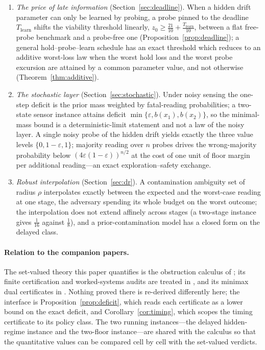\documentclass[11pt,a4paper]{article}
\theoremstyle{plain}
\theoremstyle{definition}
\theoremstyle{remark}
\newcommand{\Tl}{T_{\mathrm{learn}}}
\begin{document}
\begin{enumerate}[leftmargin=1.6em,itemsep=1pt]
\item \emph{The price of late information} (Section~\ref{sec:deadline}). When a hidden drift parameter can only be learned by probing, a probe pinned to the deadline $\Tl$ shifts the viability threshold linearly, $z_0\ge\tfrac{21}{10}+\tfrac{\Tl}{10}$, between a flat free-probe benchmark and a probe-free one (Proposition~\ref{prop:deadline}); a general hold--probe--learn schedule has an exact threshold which reduces to an additive worst-loss law when the worst hold loss and the worst probe excursion are attained by a common parameter value, and not otherwise (Theorem~\ref{thm:additive}).
\item \emph{The stochastic layer} (Section~\ref{sec:stochastic}). Under noisy sensing the one-step deficit is the prior mass weighted by fatal-reading probabilities; a two-state sensor instance attains deficit $\min\{\varepsilon,b(x_1),b(x_2)\}$, so the minimal-mass bound is a deterministic-limit statement and not a law of the noisy layer. A single noisy probe of the hidden drift yields exactly the three value levels $\{0,1-\varepsilon,1\}$; majority reading over $n$ probes drives the wrong-majority probability below $(4\varepsilon(1-\varepsilon))^{n/2}$ at the cost of one unit of floor margin per additional reading---an exact exploration--safety exchange.
\item \emph{Robust interpolation} (Section~\ref{sec:dr}). A contamination ambiguity set of radius $\rho$ interpolates exactly between the expected and the worst-case reading at one stage, the adversary spending its whole budget on the worst outcome; the interpolation does not extend affinely across stages (a two-stage instance gives $\tfrac1{16}$ against $\tfrac18$), and a prior-contamination model has a closed form on the delayed class.
\end{enumerate}

\paragraph{Relation to the companion papers.}
The set-valued theory this paper quantifies is the obstruction calculus of \cite{Abaee2026calc}; its finite certification and worked-systems audits are treated in \cite{Abaee2026cert,Abaee2026worked}, and its minimax dual certificates in \cite{Abaee2026minimax}. Nothing proved there is re-derived differently here; the interface is Proposition~\ref{prop:deficit}, which reads each certificate as a lower bound on the exact deficit, and Corollary~\ref{cor:timing}, which scopes the timing certificate to its policy class. The two running instances---the delayed hidden-regime instance and the two-floor instance---are shared with the calculus so that the quantitative values can be compared cell by cell with the set-valued verdicts.
\end{document}
